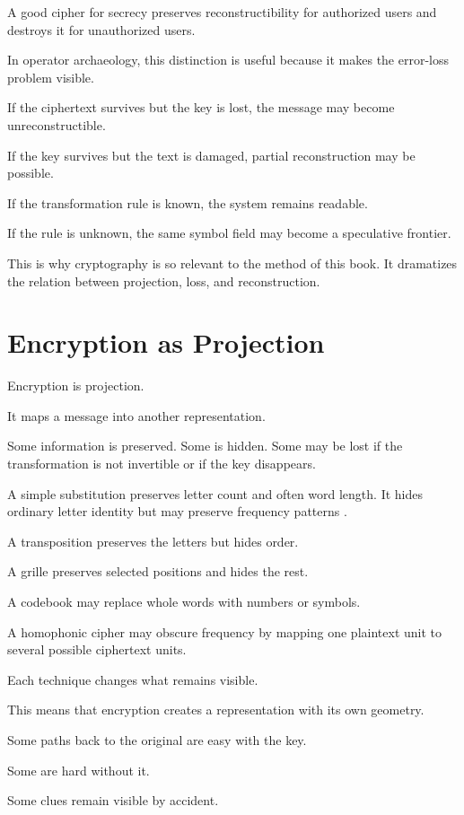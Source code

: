 \documentclass[11pt]{book}
\begin{document}
A good cipher for secrecy preserves reconstructibility for authorized users and destroys it for unauthorized users.

In operator archaeology, this distinction is useful because it makes the error-loss problem visible.

If the ciphertext survives but the key is lost, the message may become unreconstructible.

If the key survives but the text is damaged, partial reconstruction may be possible.

If the transformation rule is known, the system remains readable.

If the rule is unknown, the same symbol field may become a speculative frontier.

This is why cryptography is so relevant to the method of this book. It dramatizes the relation between projection, loss, and reconstruction.

\section{Encryption as Projection}

Encryption is projection.

It maps a message into another representation.

Some information is preserved. Some is hidden. Some may be lost if the transformation is not invertible or if the key disappears.

A simple substitution preserves letter count and often word length. It hides ordinary letter identity but may preserve frequency patterns \cite{Kahn1996Codebreakers,Singh1999CodeBook}.

A transposition preserves the letters but hides order.

A grille preserves selected positions and hides the rest.

A codebook may replace whole words with numbers or symbols.

A homophonic cipher may obscure frequency by mapping one plaintext unit to several possible ciphertext units.

Each technique changes what remains visible.

This means that encryption creates a representation with its own geometry.

Some paths back to the original are easy with the key.

Some are hard without it.

Some clues remain visible by accident.
\end{document}
